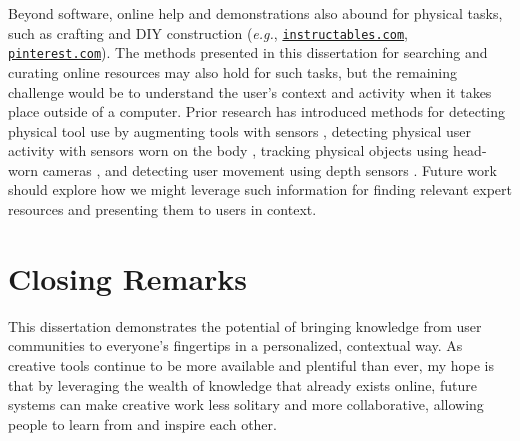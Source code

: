 Beyond software, online help and demonstrations also abound for physical tasks, such as crafting and DIY construction (\textit{e.g.}, \href{https://www.instructables.com/}{\nolinkurl{instructables.com}}, \href{https://www.pinterest.com/}{\nolinkurl{pinterest.com}}). The methods presented in this dissertation for searching and curating online resources may also hold for such tasks, but the remaining challenge would be to understand the user's context and activity when it takes place outside of a computer. Prior research has introduced methods for detecting physical tool use by augmenting tools with sensors \cite{Schoop2016, Antifakos2002}, detecting physical user activity with sensors worn on the body \cite{Lukowicz2004}, tracking physical objects using head-worn cameras \cite{Henderson2011}, and detecting user movement using depth sensors \cite{Anderson2013}. Future work should explore how we might leverage such information for finding relevant expert resources and presenting them to users in context.



\section{Closing Remarks}
This dissertation demonstrates the potential of bringing knowledge from user communities to everyone's fingertips in a personalized, contextual way. As creative tools continue to be more available and plentiful than ever, my hope is that by leveraging the wealth of knowledge that already exists online, future systems can make creative work less solitary and more collaborative, allowing people to learn from and inspire each other.